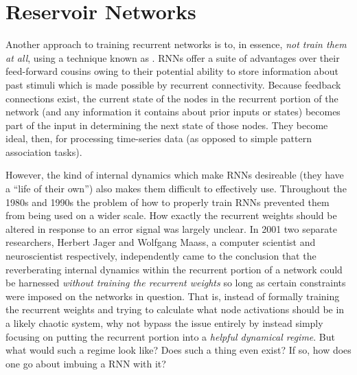 \chapter{Reservoir Networks}\label{ch_reservoir}



Another approach to training recurrent networks is to, in essence, \emph{not train them at all}, using a technique known as . RNNs offer a suite of advantages over their feed-forward cousins owing to their potential ability to store information about past stimuli which is made possible by recurrent connectivity. Because feedback connections exist, the current state of the nodes in the recurrent portion of the network (and any information it contains about prior inputs or states) becomes part of the input in determining the next state of those nodes. They become ideal, then, for processing time-series data (as opposed to simple pattern association tasks). 

However, the kind of internal dynamics which make RNNs desireable (they have a ``life of their own'') also makes them difficult to effectively use. Throughout the 1980s and 1990s the problem of how to properly train RNNs prevented them from being used on a wider scale. How exactly the recurrent weights should be altered in response to an error signal was largely unclear. In 2001 two separate researchers, Herbert Jager and Wolfgang Maass, a computer scientist and neuroscientist respectively, independently came to the conclusion that the reverberating internal dynamics within the recurrent portion of a network could be harnessed \emph{without training the recurrent weights} so long as certain constraints were imposed on the networks in question. That is, instead of formally training the recurrent weights and trying to calculate what node activations should be in a likely chaotic system, why not bypass the issue entirely by instead simply focusing on putting the recurrent portion into a \emph{helpful dynamical regime}. But what would such a regime look like? Does such a thing even exist? If so, how does one go about imbuing a RNN with it?

